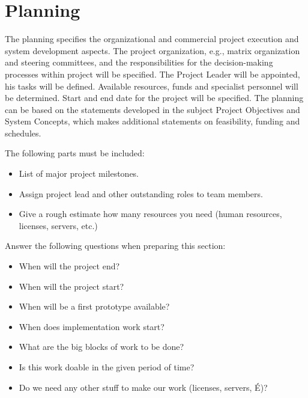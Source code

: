 \documentclass[12pt]{article}
\theoremstyle{definition}
\newenvironment{explanation}{%
   \setlength{\parindent}{0pt}
   \itshape
   \color{blue}
}{}
\begin{document}
\pagebreak
\section{Planning}
\begin{explanation}
The planning specifies the organizational and commercial project execution and system development aspects. The project organization, e.g., matrix organization and steering committees, and the responsibilities for the decision-making processes within project will be specified.
The Project Leader will be appointed, his tasks will be defined. Available resources, funds and specialist personnel will be determined. Start and end date for the project will be specified. The planning can be based on the statements developed in the subject Project Objectives and System Concepts, which makes additional statements on feasibility, funding and schedules.

The following parts must be included:
\begin{itemize}
\item List of major project milestones.
\item Assign project lead and other outstanding roles to team members.
\item Give a rough estimate how many resources you need (human resources, licenses, servers, etc.)
\end{itemize}

Answer the following questions when preparing this section:
\begin{itemize}
\item When will the project end?
\item When will the project start?
\item When will be a first prototype available?
\item When does implementation work start?
\item What are the big blocks of work to be done?
\item Is this work doable in the given period of time?
\item Do we need any other stuff to make our work (licenses, servers, É)?
\end{itemize}
\end{explanation}
\end{document}
